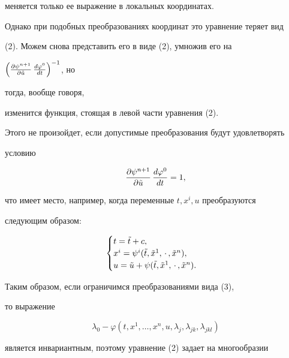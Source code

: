 меняется только ее выражение в локальных координатах. 


Однако при подобных преобразованиях координат это уравнение теряет вид 


(2). Можем снова представить его в виде (2), умножив его на 


$\Bigl(\frac{\partial\psi^{n+1}}{\partial\Tilde u}\, 


\frac{d\varphi^0}{dt}\Bigr)^{-1}$, но  


тогда, вообще говоря, 


изменится функция, стоящая в левой части уравнения (2). 


 


 


Этого не произойдет, если допустимые преобразования будут удовлетворять 


условию 


$$ 


\frac{\partial\psi^{n+1}}{\partial\Tilde u}\, 


\frac{d\varphi^0}{dt}=1, 


$$ 


что имеет место, например, когда переменные $t,x^i,u$ преобразуются 


следующим образом: 


\begin{equation} 


\begin{cases} 


t=\Tilde t+c,\\ 


x^i=\psi^i(\Tilde t,\Tilde x^1,\,\cdot\,,\Tilde x^n),\\ 


u=\Tilde u+\psi(\Tilde t,\Tilde x^1,\,\cdot\,,\Tilde x^n). 


\end{cases} 


\end{equation} 


Таким образом, если ограничимся преобразованиями вида (3), 


то выражение 


$$


\lambda_0-\varphi(t,x^1,\dotsc,x^n,u,\lambda_j,\lambda_{jk}, 


\lambda_{jkl}) 


$$


является инвариантным, поэтому уравнение (2) задает на многообразии 


